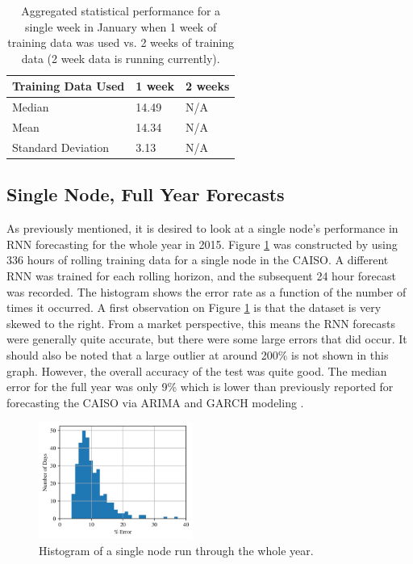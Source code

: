 \documentclass[sigconf]{acmart}
\begin{document}
\begin{table}[h]
\begin{tabular}{lll}
\hline
\hline
Training Data Used & 1 week & 2 weeks \\
\hline
Median             & 14.49  & N/A     \\
Mean               & 14.34  & N/A     \\
Standard Deviation & 3.13   & N/A    \\
\hline
\hline
\end{tabular}
\caption{Aggregated statistical performance for a single week in January when 1 week of training data was used vs. 2 weeks of training data (2 week data is running currently).}
\label{tab:all_nodes}
\end{table}

\subsection{Single Node, Full Year Forecasts}

As previously mentioned, it is desired to look at a single node's performance in RNN forecasting for the whole year in 2015. Figure \ref{fig:hist_single} was constructed by using 336 hours of rolling training data for a single node in the CAISO. A different RNN was trained for each rolling horizon, and the subsequent 24 hour forecast was recorded. The histogram shows the error rate as a function of the number of times it occurred. A first observation on Figure \ref{fig:hist_single} is that the dataset is very skewed to the right. From a market perspective, this means the RNN forecasts were generally quite accurate, but there were some large errors that did occur. It should also be noted that a large outlier at around 200\% is not shown in this graph. However, the overall accuracy of the test was quite good. The median error for the full year was only 9\% which is lower than previously reported for forecasting the CAISO via ARIMA and GARCH modeling \cite{Conejo2005a,Garcia2005}. 

\begin{figure}[h]
\includegraphics[width=0.45\textwidth]{fig_7.png}
\caption{Histogram of a single node run through the whole year.}
\label{fig:hist_single}
\end{figure}
\end{document}
